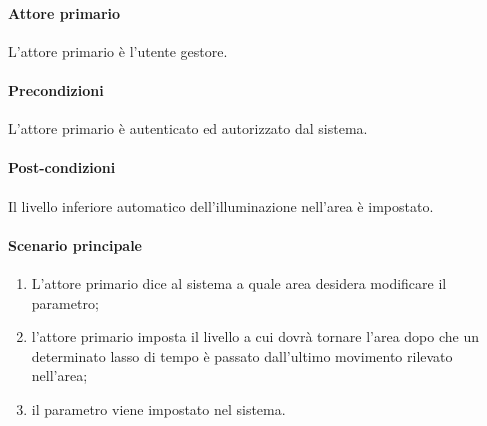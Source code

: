 \paragraph{Attore primario} L'attore primario è l'utente gestore.
\paragraph{Precondizioni} L'attore primario è autenticato ed autorizzato dal sistema.
\paragraph{Post-condizioni} Il livello inferiore automatico dell'illuminazione nell'area è impostato.
\paragraph{Scenario principale}
\begin{enumerate}
    \item L'attore primario dice al sistema a quale area desidera modificare il parametro;
    \item l'attore primario imposta il livello a cui dovrà tornare l'area dopo che un determinato lasso di tempo è passato dall'ultimo movimento rilevato nell'area;
    \item il parametro viene impostato nel sistema.
\end{enumerate}
